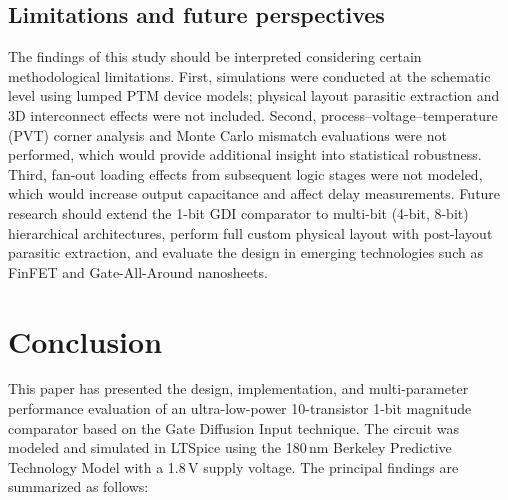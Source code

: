 \documentclass[final,5p,times,twocolumn]{elsarticle}
\begin{document}
\subsection{Limitations and future perspectives}

The findings of this study should be interpreted considering certain methodological limitations. First, simulations were conducted at the schematic level using lumped PTM device models; physical layout parasitic extraction and 3D interconnect effects were not included. Second, process--voltage--temperature (PVT) corner analysis and Monte Carlo mismatch evaluations were not performed, which would provide additional insight into statistical robustness. Third, fan-out loading effects from subsequent logic stages were not modeled, which would increase output capacitance and affect delay measurements. Future research should extend the 1-bit GDI comparator to multi-bit (4-bit, 8-bit) hierarchical architectures, perform full custom physical layout with post-layout parasitic extraction, and evaluate the design in emerging technologies such as FinFET and Gate-All-Around nanosheets.


\section{Conclusion}
\label{sec:conclusion}

This paper has presented the design, implementation, and multi-parameter performance evaluation of an ultra-low-power 10-transistor 1-bit magnitude comparator based on the Gate Diffusion Input technique. The circuit was modeled and simulated in LTSpice using the 180\,nm Berkeley Predictive Technology Model with a 1.8\,V supply voltage. The principal findings are summarized as follows:
\end{document}
